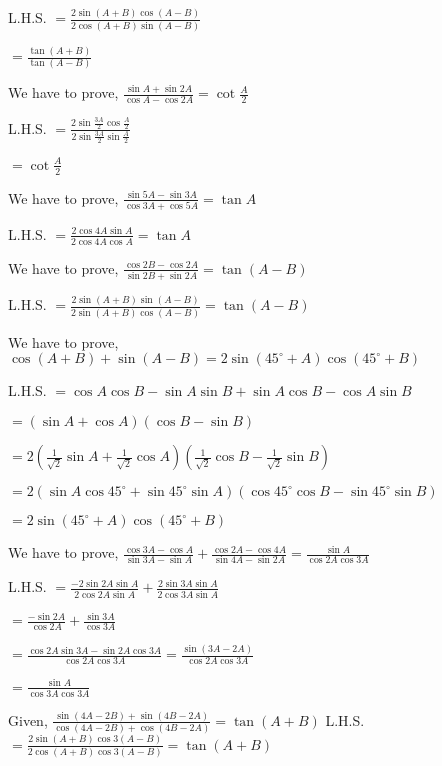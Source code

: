   L.H.S. $= \frac{2\sin(A + B)\cos(A - B)}{2\cos(A + B)\sin(A - B)}$

  $= \frac{\tan(A + B)}{\tan(A - B)}$

\item We have to prove, $\frac{\sin A + \sin 2A}{\cos A - \cos 2A} = \cot \frac{A}{2}$

  L.H.S. $= \frac{2\sin\frac{3A}{2}\cos\frac{A}{2}}{2\sin\frac{3A}{2}\sin\frac{A}{2}}$

  $= \cot\frac{A}{2}$

\item We have to prove, $\frac{\sin 5A - \sin 3A}{\cos 3A + \cos 5A} = \tan A$

  L.H.S. $= \frac{2\cos4A\sin A}{2\cos4A\cos A} = \tan A$

\item We have to prove, $\frac{\cos 2B - \cos 2A}{\sin 2B + \sin 2A} = \tan(A - B)$

  L.H.S. $= \frac{2\sin(A + B)\sin(A - B)}{2\sin(A + B)\cos(A - B)} = \tan(A - B)$

\item We have to prove, $\cos (A + B) + \sin(A - B) = 2\sin(45^\circ + A)\cos(45^\circ + B)$

  L.H.S. $= \cos A\cos B - \sin A\sin B + \sin A\cos B - \cos A\sin B$

  $= (\sin A + \cos A)(\cos B - \sin B)$

  $= 2(\frac{1}{\sqrt{2}}\sin A + \frac{1}{\sqrt{2}}\cos A)(\frac{1}{\sqrt{2}}\cos B - \frac{1}{\sqrt{2}}\sin B)$

  $= 2(\sin A\cos 45^\circ + \sin 45^\circ\sin A)(\cos 45^\circ\cos B - \sin 45^\circ\sin B)$

  $= 2\sin(45^\circ + A)\cos(45^\circ + B)$

\item We have to prove, $\frac{\cos 3A - \cos A}{\sin 3A - \sin A} + \frac{\cos 2A - \cos 4A}{\sin 4A - \sin 2A} = \frac{\sin A}{\cos
  2A\cos 3A}$

  L.H.S. $= \frac{-2\sin 2A\sin A}{2\cos 2A\sin A} + \frac{2\sin 3A\sin A}{2\cos 3A\sin A}$

  $= \frac{-\sin 2A}{\cos 2A} + \frac{\sin 3A}{\cos 3A}$

  $= \frac{\cos 2A\sin 3A - \sin 2A\cos 3A}{\cos 2A\cos 3A} = \frac{\sin(3A - 2A)}{\cos 2A\cos 3A}$

  $= \frac{\sin A}{\cos 3A\cos 3A}$

\item Given, $\frac{\sin (4A - 2B) + \sin (4B - 2A)}{\cos (4A - 2B) + \cos (4B - 2A)} = \tan(A + B)$
  L.H.S. $= \frac{2\sin(A + B)\cos3(A - B)}{2\cos(A + B)\cos3(A - B)} = \tan(A + B)$

